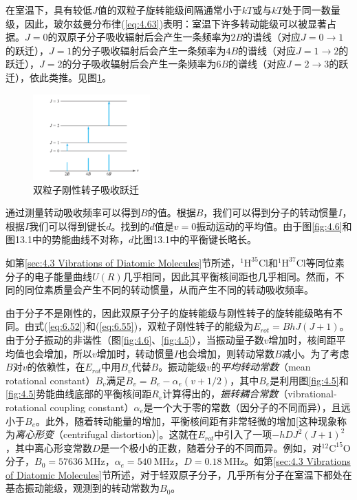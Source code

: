     在室温下，具有较低$J$值的双粒子旋转能级间隔通常小于$kT$或与$kT$处于同一数量级，因此，玻尔兹曼分布律(\ref{eq:4.63})表明：室温下许多转动能级可以被显著占据。$J=0$的双原子分子吸收辐射后会产生一条频率为$2B$的谱线（对应$J = 0 \to 1$的跃迁），$J=1$的分子吸收辐射后会产生一条频率为$4B$的谱线（对应$J = 1 \to 2$的跃迁），$J=2$的分子吸收辐射后会产生一条频率为$6B$的谱线（对应$J = 2 \to 3$的跃迁），依此类推。见图\ref{fig:6.4}。
    \begin{figure}[ht]
        \centering
        \includegraphics[width=0.4\textwidth]{Figures/6.4.png}
        \caption{双粒子刚性转子吸收跃迁}
        \label{fig:6.4}
    \end{figure}

    通过测量转动吸收频率可以得到$B$的值。根据$B$，我们可以得到分子的转动惯量$I$，根据$I$我们可以得到键长$d$。找到的$d$值是$v=0$振动运动的平均值。由于图\ref{fig:4.6}和图13.1中的势能曲线不对称，$d$比图13.1中的平衡键长略长。

    如第\ref{sec:4.3 Vibrations of Diatomic Molecules}节所述，$^1\mathrm{H}^{35}\mathrm{Cl}$和$^1\mathrm{H}^{37}\mathrm{Cl}$等同位素分子的电子能量曲线$U\left(R\right)$几乎相同，因此其平衡核间距也几乎相同。然而，不同的同位素质量会产生不同的转动惯量，从而产生不同的转动吸收频率。

    由于分子不是刚性的，因此双原子分子的旋转能级与刚性转子的旋转能级略有不同。由式(\ref{eq:6.52})和(\ref{eq:6.55})，双粒子刚性转子的能级为$E_{rot} = BhJ\left(J+1\right)$。由于分子振动的非谐性（图\ref{fig:4.6}、\ref{fig:4.5}），当振动量子数$v$增加时，核间距平均值也会增加，所以$v$增加时，转动惯量$I$也会增加，则转动常数$B$减小。为了考虑$B$对$v$的依赖性，在$E_{rot}$中用$B_v$代替$B$。振动能级$v$的\textit{平均转动常数}（mean rotational constant）$B_v$满足$B_v = B_e - \alpha_e\left(v+1/2\right)$，其中$B_e$是利用图\ref{fig:4.5}和\ref{fig:4.5}势能曲线底部的平衡核间距$R_e$计算得出的，\textit{振转耦合常数}（vibrational-rotational coupling constant）$\alpha_e$是一个大于零的常数（因分子的不同而异），且远小于$B_e$。此外，随着转动能量的增加，平衡核间距有非常轻微的增加[这种现象称为\textit{离心形变}（centrifugal distortion）]。这就在$E_{rot}$中引入了一项$-hDJ^2\left(J+1\right)^2$，其中离心形变常数$D$是一个极小的正数，随着分子的不同而异。例如，对$^{12}\mathrm{C}^{15}\mathrm{O}$分子，$B_0 = 57636 \: \mathrm{MHz}$，$\alpha_e = 540 \: \mathrm{MHz}$，$D = 0.18 \: \mathrm{MHz}$。如第\ref{sec:4.3 Vibrations of Diatomic Molecules}节所述，对于轻双原子分子，几乎所有分子在室温下都处在基态振动能级，观测到的转动常数为$B_0$。

